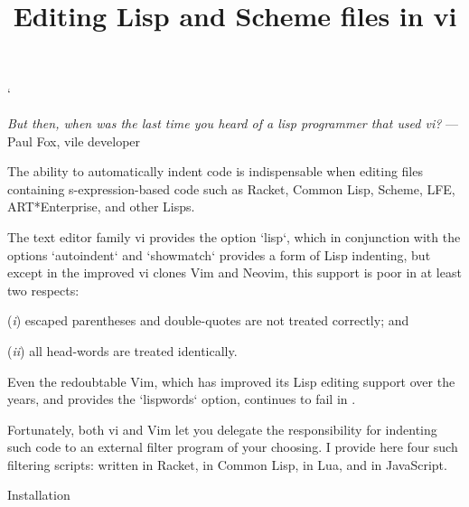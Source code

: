 


\overfullrule 0pt
\def\TZPhsize{450pt}
\activettchar`
\def\item#1{({\it #1\/})}
\title{Editing Lisp and Scheme files in vi}

\ifx\shipout\UnDeFiNeD
\centerline{}
\fi

\centerline{}

\medskip

{\obeylines\raggedleft
\ifx\shipout\UnDeFiNeD\small\fi
{\it But then, when was the last time you heard
of a lisp programmer that used vi?}
— Paul Fox, vile developer
}

\bigskip

The ability to automatically indent code is indispensable when editing
files containing s-expression-based code such as Racket, Common Lisp, Scheme,
LFE,
ART*Enterprise, and other Lisps.

The text editor family vi provides the option `lisp`, which in
conjunction with the options `autoindent` and `showmatch`
provides a form of Lisp indenting, but except in the improved vi
clones
Vim and Neovim, this support is poor in at least two respects:

\item{i} escaped
parentheses and double-quotes are not treated correctly; and

\item{ii} all
head-words are
treated identically.

Even the redoubtable Vim, which has improved its Lisp editing
support over the years, and provides the `lispwords` option, continues to fail in
.

Fortunately, both vi and Vim let you delegate the responsibility
for indenting such code to an external filter program of your
choosing.  I provide here four such filtering scripts:
written in Racket,
 in Common
Lisp,
 in Lua, and
 in JavaScript.

\beginsection Installation

